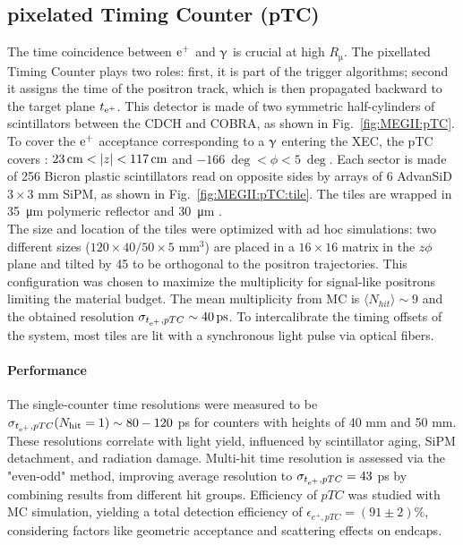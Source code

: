\begin{refsection}
    \subsection{pixelated Timing Counter (pTC)}
        The time coincidence between $\text{e}^+$ and $\upgamma$ is crucial at high $R_\upmu$. 
        The pixellated Timing Counter plays two roles: first, it is part of the trigger algorithms; second it assigns the time of the positron track, which is then propagated backward to the target plane $t_{\text{e}^+}$. 
        This detector is made of two symmetric half-cylinders of scintillators between the CDCH and COBRA, as shown in Fig.~\ref{fig:MEGII:pTC}.
        To cover the $\text{e}^+$ acceptance corresponding to a $\upgamma$ entering the XEC, the pTC covers : $\SI{23}{cm}<\abs{z}<\SI{117}{cm}$ and $\SI{-166}{\deg}<\phi<\SI{5}{\deg}$. 
        Each sector is made of 256 Bicron  plastic scintillators read on opposite sides by arrays of 6 AdvanSiD $3\times3$ mm SiPM, as shown in Fig.~\ref{fig:MEGII:pTC:tile}.
        The tiles are wrapped in \SI{35}{\micro m} polymeric reflector and \SI{30}{\micro m} \tedlar.\\
        The size and location of the tiles were optimized with ad hoc simulations: two different sizes ($120\times40/50\times5$ mm$^3$)  are placed in a $16\times16$ matrix in the $z\phi$ plane and tilted by \SI{45}{\deg} to be orthogonal to the positron trajectories.
        This configuration was chosen to maximize the multiplicity for signal-like positrons limiting the material budget.
        The mean multiplicity from MC is $\langle N_{hit} \rangle\sim 9$ and the obtained resolution $\sigma_{t_{\Ae}, pTC} \sim \SI{40}{\pico s}$.
        To intercalibrate the timing offsets of the system, most tiles are lit with a synchronous light pulse via optical fibers.
        
        \paragraph{Performance} The single-counter time resolutions were measured to be $\sigma_{t_{\text{e}^+}, pTC}(N_{\text{hit}} = 1) \sim 80-120$ ps for counters with heights of 40 mm and 50 mm. These resolutions correlate with light yield, influenced by scintillator aging, SiPM detachment, and radiation damage.
        Multi-hit time resolution is assessed via the "even-odd" method, improving average resolution to $\sigma_{t_{\text{e}^+}, pTC} = 43$ ps by combining results from different hit groups. 
        Efficiency of $pTC$ was studied with MC simulation, yielding a total detection efficiency of $\epsilon_{e^+, pTC} = (91 \pm 2)\%$, considering factors like geometric acceptance and scattering effects on endcaps.


\end{refsection}
